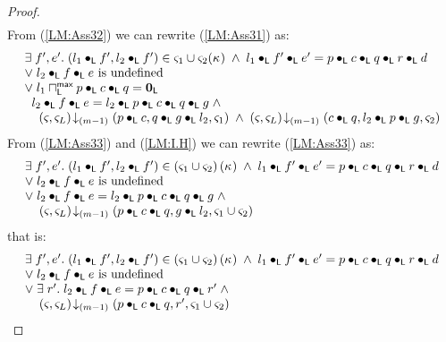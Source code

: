 \begin{lemma}[]
\begin{proof}
\begin{align}
\end{align}
%
From (\ref{LM:Ass32}) we can rewrite (\ref{LM:Ass31}) as:
%
\begin{align}
	\begin{array}{l}
		\exists\; f', e'.\; (l_1 \bullet_{\textsf{L}} f', l_2 \bullet_{\textsf{L}} f') \in \varsigma_{1} \cup \varsigma_{2}(\kappa_{}) \;\land\; l_1 \bullet_{\textsf{L}} f' \bullet_{\textsf{L}} e' =  p \bullet_{\textsf{L}} c \bullet_{\textsf{L}} q \bullet_{\textsf{L}} r \bullet_{\textsf{L}} d\\
		\lor\;l_2 \bullet_{\textsf{L}} f \bullet_{\textsf{L}} e \text{ is undefined}\\
		\lor\; l_1 \sqcap_{\textsf{L}}^{\textsf{max}} p \bullet_{\textsf{L}} c \bullet_{\textsf{L}} q  = \mathbf{0}_{\textsf{L}}\\
		\hspace*{0.2cm} l_2 \bullet_{\textsf{L}} f \bullet_{\textsf{L}} e = l_2 \bullet_{\textsf{L}} p \bullet_{\textsf{L}} c \bullet_{\textsf{L}} q \bullet_{\textsf{L}} g\;\land\\
		\hspace*{0.4cm}\left(\varsigma_{}, \varsigma_{L}\right) \!\downarrow_{(m-1)} \left(p \bullet_{\textsf{L}} c, q \bullet_{\textsf{L}} g \bullet_{\textsf{L}} l_2, \varsigma_{1} \right) \;\land\; \left(\varsigma_{}, \varsigma_{L}\right) \!\downarrow_{(m-1)} \left(c \bullet_{\textsf{L}} q, l_2 \bullet_{\textsf{L}} p \bullet_{\textsf{L}} g, \varsigma_{2} \right)
	\end{array}
	\label{LM:Ass33}
\end{align}
From (\ref{LM:Ass33}) and (\ref{LM:I.H}) we can rewrite (\ref{LM:Ass33}) as:
%
\begin{align}
	\begin{array}{l}
		\exists\; f', e'.\; (l_1 \bullet_{\textsf{L}} f', l_2 \bullet_{\textsf{L}} f') \in \left(\varsigma_{1} \cup \varsigma_{2}\right)(\kappa_{}) \;\land\; l_1 \bullet_{\textsf{L}} f' \bullet_{\textsf{L}} e'  =  p \bullet_{\textsf{L}} c \bullet_{\textsf{L}} q \bullet_{\textsf{L}} r \bullet_{\textsf{L}} d\\
		\lor\;l_2 \bullet_{\textsf{L}} f \bullet_{\textsf{L}} e \text{ is undefined}\\
		\lor\; l_2 \bullet_{\textsf{L}} f \bullet_{\textsf{L}} e = l_2 \bullet_{\textsf{L}} p \bullet_{\textsf{L}} c \bullet_{\textsf{L}} q  \bullet_{\textsf{L}} g \;\land\\
		\hspace*{0.4cm} \left(\varsigma_{}, \varsigma_{L}\right) \!\downarrow_{(m-1)} \left(p \bullet_{\textsf{L}} c \bullet_{\textsf{L}} q, g \bullet_{\textsf{L}} l_2, \varsigma_{1} \cup \varsigma_{2}\right)
	\end{array}  \label{LM:Ass34}
\end{align}
%
that is:
%
\begin{align}
	\begin{array}{l}
		\exists\; f', e'.\; (l_1 \bullet_{\textsf{L}} f', l_2 \bullet_{\textsf{L}} f') \in \left(\varsigma_{1} \cup \varsigma_{2}\right)(\kappa_{}) \;\land\; l_1 \bullet_{\textsf{L}} f' \bullet_{\textsf{L}} e'  =  p \bullet_{\textsf{L}} c \bullet_{\textsf{L}} q \bullet_{\textsf{L}} r \bullet_{\textsf{L}} d\\
		\lor\;l_2 \bullet_{\textsf{L}} f \bullet_{\textsf{L}} e \text{ is undefined}\\
		\lor\; \exists\; r'.\; l_2 \bullet_{\textsf{L}} f \bullet_{\textsf{L}} e = p \bullet_{\textsf{L}} c \bullet_{\textsf{L}} q  \bullet_{\textsf{L}} r' \;\land\\
		\hspace*{0.4cm} \left(\varsigma_{}, \varsigma_{L}\right) \!\downarrow_{(m-1)} \left(p \bullet_{\textsf{L}} c \bullet_{\textsf{L}} q, r', \varsigma_{1} \cup \varsigma_{2}\right)
	\end{array}  \label{LM:Ass34}
\end{align}
%
%
%
%
%
%


\end{proof}
\end{lemma}

